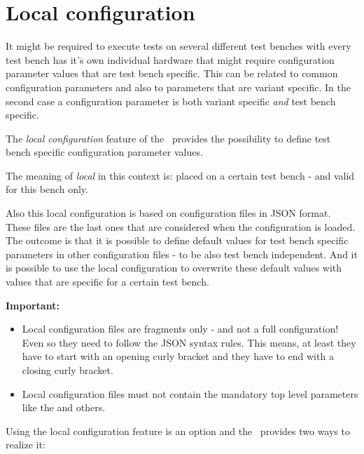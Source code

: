 \section{Local configuration}

It might be required to execute tests on several different test benches with every test bench has it's own individual hardware
that might require configuration parameter values that are test bench specific. This can be related to common configuration parameters
and also to parameters that are variant specific. In the second case a configuration parameter is both variant specific \textit{and}
test bench specific.

The \textit{local configuration} feature of the \pkg\ provides the possibility to define test bench specific configuration parameter values.

The meaning of \textit{local} in this context is: placed on a certain test bench - and valid for this bench only.

Also this local configuration is based on configuration files in JSON format. These files are the last ones that are considered when the configuration is loaded.
The outcome is that it is possible to define default values for test bench specific parameters in other configuration files - to be also test bench independent.
And it is possible to use the local configuration to overwrite these default values with values that are specific for a certain test bench.

\textbf{Important:}

\begin{itemize}
   \item Local configuration files are fragments only - and not a full configuration! Even so they need to follow the JSON syntax rules.
         This means, at least they have to start with an opening curly bracket and they have to end with a closing curly bracket.
   \item Local configuration files must not contain the mandatory top level parameters like the  and others.
\end{itemize}

Using the local configuration feature is an option and the \pkg\ provides two ways to realize it:

